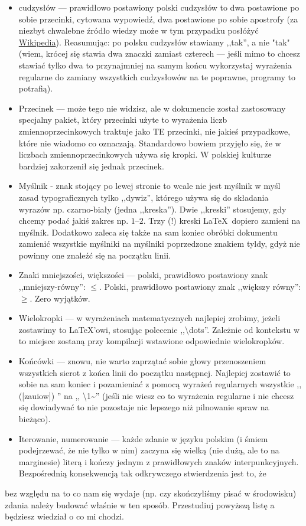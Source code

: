 \begin{itemize}
	\item cudzysłów --- prawidłowo postawiony polski cudzysłów to dwa postawione po sobie przecinki, cytowana wypowiedź, dwa postawione po sobie apostrofy (za niezbyt chwalebne źródło wiedzy może w tym przypadku posłóżyć \href{https://en.wikipedia.org/wiki/Quotation_mark}{Wikipedia}). Reasumując: po polsku cudzysłów stawiamy ,,tak'', a nie "tak" (wiem, krócej się stawia dwa znaczki zamiast czterech --- jeśli mimo to chcesz stawiać tylko dwa to przynajmniej na samym końcu wykorzystaj wyrażenia regularne do zamiany wszystkich cudzysłowów na te poprawne, programy to potrafią).
	\item Przecinek --- może tego nie widzisz, ale w dokumencie został zastosowany specjalny pakiet, który przecinki użyte to wyrażenia liczb zmiennoprzecinkowych traktuje jako TE przecinki, nie jakieś przypadkowe, które nie wiadomo co oznaczają.
	Standardowo bowiem przyjęło się, że w liczbach zmiennoprzecinkowych używa się kropki.
	W polskiej kulturze bardziej zakorzenił się jednak przecinek.
	\item Myślnik - znak stojący po lewej stronie to wcale nie jest myślnik w myśl zasad typograficznych tylko ,,dywiz'', którego używa się do składania wyrazów np. czarno-biały (jedna ,,kreska'').
	Dwie ,,kreski'' stosujemy, gdy chcemy podać jakiś zakres np. $1$--$2$.
	Trzy (!) kreski \LaTeX~dopiero zamieni na myślnik.
	Dodatkowo zaleca się także na sam koniec obróbki dokumentu zamienić wszystkie myślniki na myślniki poprzedzone znakiem tyldy, gdyż nie powinny one znaleźć się na początku linii.
	\item Znaki mniejszości, większości --- polski, prawidłowo postawiony znak ,,mniejszy-równy'': $\leqslant$.
	Polski, prawidłowo postawiony znak ,,większy równy'': $\geqslant$.
	Zero wyjątków.
	\item Wielokropki --- w wyrażeniach matematycznych najlepiej zrobimy, jeżeli zostawimy to \LaTeX'owi, stosując polecenie ,,\textbackslash dots''.
	Zależnie od kontekstu w to miejsce zostaną przy kompilacji wstawione odpowiednie wielokropków.
	\item Końcówki --- znowu, nie warto zaprzątać sobie głowy przenoszeniem wszystkich sierot z końca linii do początku następnej.
	Najlepiej zostawić to sobie na sam koniec i pozamieniać z pomocą wyrażeń regularnych wszystkie ,, ([zauiow]) '' na ,, \textbackslash1\textasciitilde'' (jeśli nie wiesz co to wyrażenia regularne i nie chcesz się dowiadywać to nie pozostaje nic lepszego niż pilnowanie spraw na bieżąco).
	\item Iterowanie, numerowanie --- każde zdanie w języku polskim (i śmiem podejrzewać, że nie tylko w nim) zaczyna się wielką (nie dużą, ale to na marginesie) literą i kończy jednym z prawidłowych znaków interpunkcyjnych.
	Bezpośrednią konsekwencją tak odkrywczego stwierdzenia jest to, że
\end{itemize}
bez względu na to co nam się wydaje (np. czy skończyliśmy pisać w środowisku) zdania należy budować właśnie w ten sposób.
Przestudiuj powyższą listę a będziesz wiedział o co mi chodzi.

